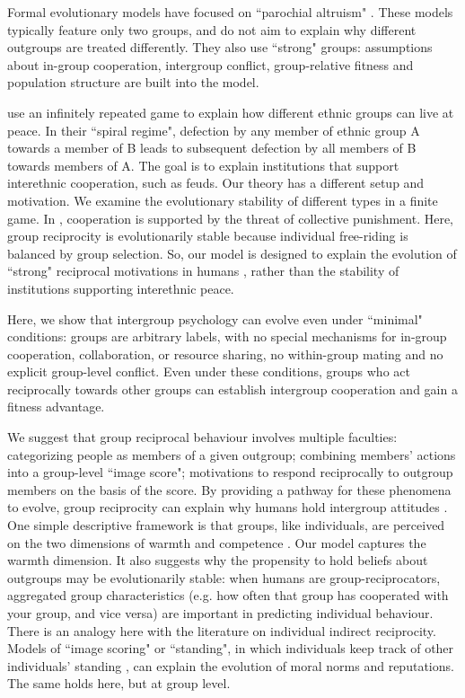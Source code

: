 \documentclass[12pt,a4paper]{article}
\begin{document}
Formal evolutionary models have focused on ``parochial altruism" 
\parencite{choi2007coevolution,smirnov2007ancestral,rusch2014evolutionary}. 
These models typically feature only two groups, and do not aim to explain why
different outgroups are treated differently. They also use ``strong" groups: 
assumptions about in-group cooperation, intergroup conflict, group-relative 
fitness and population structure are built into the model. 

\textcite{fearon1996explaining} use an infinitely repeated game to explain how
different ethnic groups can live at peace. In their ``spiral regime", defection
by any member of ethnic group A towards a member of B leads to subsequent 
defection by all members of B towards members of A. The goal is to explain
institutions that support interethnic cooperation, such as feuds. Our theory has a different 
setup and motivation. We examine the evolutionary stability of different types in a finite game. 
In \textcite{fearon1996explaining}, cooperation is supported by the threat of collective 
punishment. Here, group reciprocity is evolutionarily stable because 
individual free-riding is balanced by group selection. So, our model
is designed to explain the evolution of ``strong" reciprocal
motivations in humans \parencite{gintis2000strong}, rather than the 
stability of institutions supporting interethnic peace. 

Here, we show that intergroup psychology can evolve even under ``minimal" 
conditions: groups are arbitrary labels, with no special mechanisms for in-group
cooperation, collaboration, or resource sharing, no within-group mating and no
explicit group-level conflict. Even under these conditions, groups who act 
reciprocally towards other groups can establish intergroup cooperation and gain 
a fitness advantage. 

We suggest that group reciprocal behaviour involves multiple faculties: categorizing 
people as members of a given outgroup; combining members' actions into a
group-level ``image score"; motivations to respond reciprocally to outgroup 
members on the basis of the score. By providing a pathway 
for these phenomena to evolve, group reciprocity can explain why humans hold intergroup 
attitudes \parencite{brewer1985psychology,kurzban2001can}. One simple descriptive 
framework is that groups, like individuals, are perceived on the two dimensions of
warmth and competence \parencite{fiske2007universal}. Our model captures
the warmth dimension. It also suggests why the propensity to hold beliefs about
outgroups may be evolutionarily stable: when humans are group-reciprocators,
aggregated group characteristics (e.g. how often that group has cooperated
with your group, and vice versa) are important in predicting individual behaviour.
There is an analogy here with the literature on individual indirect reciprocity. Models of ``image scoring" or ``standing", in which individuals keep track of other individuals' standing \parencite[e.g.][]{nowak2005evolution}, can explain the evolution of moral norms and reputations. The same holds here, but at group level.
\end{document}
